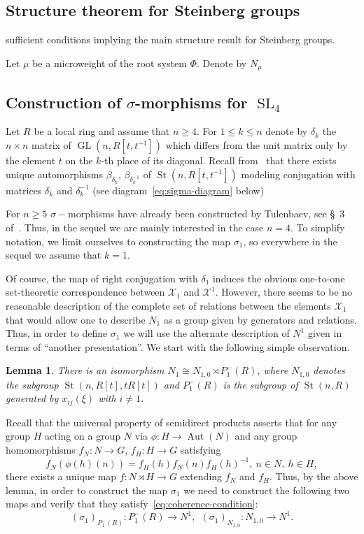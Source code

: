 \documentclass[oneside, 10pt]{amsart}
\DeclareMathOperator{\St}{St}
\DeclareMathOperator{\GL}{GL}
\DeclareMathOperator{\SL}{SL}
\DeclareMathOperator{\Aut}{Aut}
\numberwithin{equation}{section}
\newtheorem{lemma}{Lemma}
\numberwithin{lemma}{section}
\theoremstyle{definition}
\theoremstyle{remark}
\begin{document}
\subsection{Structure theorem for Steinberg groups}


sufficient conditions implying the main structure result for Steinberg groups.

Let $\mu$ be a microweight of the root system $\Phi$. Denote by $N_\mu$

\subsection{Construction of \texorpdfstring{$\sigma$}{sigma}-morphisms for $\SL_4$}
Let $R$ be a local ring and assume that $n\geq 4$.
For $1\leq k\leq n$ denote by $\delta_k$ the $n\times n$ matrix of $\GL(n, R[t, t^{-1}])$ which differs from the unit matrix 
 only by the element $t$ on the $k$-th place of its diagonal.
Recall from~\cite[Corollary~4]{Ka77} that there exists unique automorphisms $\beta_{\delta_k}$, $\beta_{\delta_k^{-1}}$ of $\St(n, R[t, t^{-1}])$
 modeling conjugation with matrices $\delta_k$ and $\delta_k^{-1}$ (see diagram~\eqref{eq:sigma-diagram} below)

For $n\geq 5$ $\sigma-$morphisms have already been constructed by Tulenbaev, see \S~3 of~\cite{Tu83}.
Thus, in the sequel we are mainly interested in the case $n=4$.
To simplify notation, we limit ourselves to constructing the map $\sigma_1$, so everywhere in the sequel we assume that $k=1$. 

Of course, the map of right conjugation with $\delta_1$ induces the obvious one-to-one set-theoretic correspondence between $\mathcal{X}_1$ and $\mathcal{X}^1$. 
However, there seems to be no reasonable description of the complete set of relations between the elements $\mathcal{X}_1$ that would allow one to describe $N_1$
 as a group given by generators and relations.
Thus, in order to define $\sigma_1$ we will use the alternate description of $N^1$ given in terms of ``another presentation''.
We start with the following simple observation.
\begin{lemma} \label{lem:n1-decomp} There is an isomorphism $N_1 \cong N_{1,0} \rtimes P_1^-(R)$, where $N_{1,0}$ denotes the subgroup $\St(n, R[t], tR[t])$
 and $P_1^-(R)$ is the subgroup of $\St(n, R)$ generated by $x_{ij}(\xi)$ with $i\neq 1$.
\end{lemma}

Recall that the universal property of semidirect products asserts that for any group $H$ acting on a group $N$ via $\phi \colon H \to \Aut(N)$ and any group homomorphisms
 $f_N\colon N \to G$, $f_H\colon H \to G$ satisfying 
\begin{equation} \label{eq:coherence-condition} f_N(\phi(h)(n)) = f_H(h) f_N(n) f_H(h)^{-1},\ n\in N,\ h\in H,\end{equation} there exists a unique map $f\colon N \rtimes H \to G$
 extending $f_N$ and $f_H$. 
Thus, by the above lemma, in order to construct the map $\sigma_1$ we need to construct the following two maps and verify that they satisfy~\eqref{eq:coherence-condition}:
\[ (\sigma_1)_{P_1^-(R)} \colon P_1^-(R) \to N^1, \ \ (\sigma_1)_{N_{1,0}} \colon N_{1,0} \to N^1.\]
\end{document}
